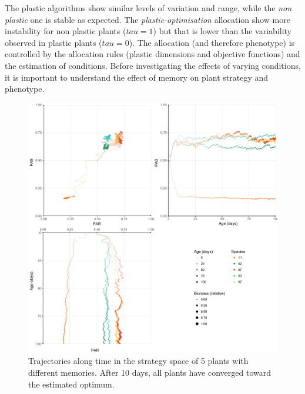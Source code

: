 The plastic algorithms show similar levels of variation and range, while the \textit{non plastic} one is stable as expected. The \textit{plastic-optimisation} allocation show more instability for non plastic plants ($tau = 1$) but that is lower than the variability observed in plastic plants ($tau = 0$). The allocation (and therefore phenotype) is controlled by the allocation rules (plastic dimensions and objective functions) and the estimation of conditions. Before investigating the effects of varying conditions, it is important to understand the effect of memory on plant strategy and phenotype.





\begin{figure}\label{fig:plastic_allocation_trajectory}
\includegraphics[width = \textwidth]{./2_PP/Figures/Individual/memory_effect.pdf}
\caption{Trajectories along time in the strategy space of 5 plants with different memories. After 10 days, all plants have converged toward the estimated optimum.}
\end{figure}

